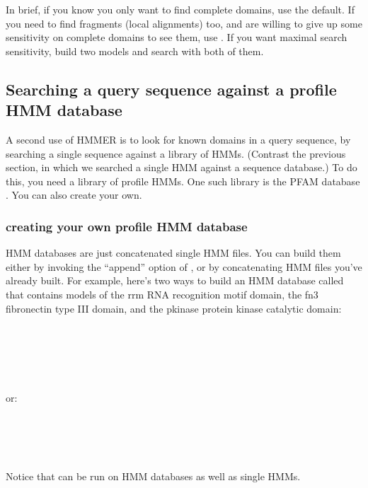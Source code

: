 In brief, if you know you only want to find complete domains, use the
 default. If you need to find fragments (local
alignments) too, and are willing to give up some sensitivity on
complete domains to see them, use . If you want
maximal search sensitivity, build two models and search with both of
them.

\subsection{Searching a query sequence against a profile HMM database}

A second use of HMMER is to look for known domains in a query
sequence, by searching a single sequence against a library of
HMMs. (Contrast the previous section, in which we searched a single
HMM against a sequence database.) To do this, you need a library of
profile HMMs. One such library is the PFAM database
\cite{Sonnhammer97,Bateman02}. You can also create your own.

\subsubsection{creating your own profile HMM database} 

HMM databases are just concatenated single HMM files. You can build
them either by invoking the  ``append'' option of
, or by concatenating HMM files you've already built.
For example, here's two ways to build an HMM database called
 that contains models of the rrm RNA recognition motif
domain, the fn3 fibronectin type III domain, and the pkinase protein
kinase catalytic domain:

\\
\\
\\
\\

or:

\\
\\
\\
\\

Notice that  can be run on HMM databases as well
as single HMMs. 

